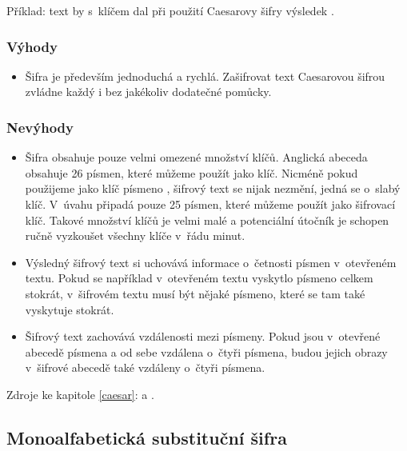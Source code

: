 \documentclass[12pt]{article}
\theoremstyle{definition}
\begin{document}
Příklad: text  by s~klíčem  dal při použití Caesarovy šifry výsledek . 

\subsubsection{Výhody}

\begin{itemize}
\item Šifra je především jednoduchá a rychlá. Zašifrovat text Caesarovou šifrou zvládne každý i bez jakékoliv dodatečné pomůcky. 
\end{itemize}

\subsubsection{Nevýhody}
\begin{itemize}
\item Šifra obsahuje pouze velmi omezené množství klíčů. Anglická abeceda obsahuje 26 písmen, které můžeme použít jako klíč. Nicméně pokud použijeme jako klíč písmeno , šifrový text se nijak nezmění, jedná se o~slabý klíč. V~úvahu připadá pouze 25 písmen, které můžeme použít jako šifrovací klíč. Takové množství klíčů je velmi malé a potenciální útočník je schopen ručně vyzkoušet všechny klíče v~řádu minut. 
\item Výsledný šifrový text si uchovává informace o~četnosti písmen v~otevřeném textu. Pokud se například v~otevřeném textu vyskytlo písmeno  celkem stokrát, v~šifrovém textu musí být nějaké písmeno, které se tam také vyskytuje stokrát. 
\item Šifrový text zachovává vzdálenosti mezi písmeny. Pokud jsou v~otevřené abecedě písmena  a  od sebe vzdálena o~čtyři písmena, budou jejich obrazy v~šifrové abecedě také vzdáleny o~čtyři písmena.
\end{itemize}

Zdroje ke kapitole \ref{caesar}: \cite{vondruska} a \cite{singh}.












\subsection{Monoalfabetická substituční šifra}
\label{mono} 
\end{document}
